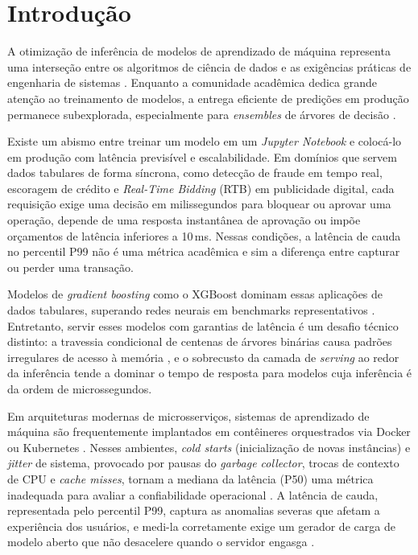 \section{Introdução}

A otimização de inferência de modelos de aprendizado de máquina representa
uma interseção entre os algoritmos de ciência de dados e as exigências
práticas de engenharia de sistemas \cite{nakandala2020}. Enquanto a
comunidade acadêmica dedica grande atenção ao treinamento de modelos, a
entrega eficiente de predições em produção permanece subexplorada,
especialmente para \textit{ensembles} de árvores de decisão
\cite{asadi2024}.

Existe um abismo entre treinar um modelo em um \textit{Jupyter Notebook} e
colocá-lo em produção com latência previsível e escalabilidade. Em domínios
que servem dados tabulares de forma síncrona, como detecção de fraude em
tempo real, escoragem de crédito e \textit{Real-Time Bidding} (RTB) em
publicidade digital, cada requisição exige uma decisão em milissegundos para
bloquear ou aprovar uma operação, depende de uma resposta instantânea de
aprovação ou impõe orçamentos de latência inferiores a 10\,ms. Nessas
condições, a latência de cauda no percentil P99 não é uma métrica acadêmica
e sim a diferença entre capturar ou perder uma transação.

Modelos de \textit{gradient boosting} como o XGBoost dominam essas
aplicações de dados tabulares, superando redes neurais em benchmarks
representativos \cite{chen2016, grinsztajn2022}. Entretanto, servir esses
modelos com garantias de latência é um desafio técnico distinto: a
travessia condicional de centenas de árvores binárias causa padrões
irregulares de acesso à memória \cite{nakandala2020}, e o sobrecusto da
camada de \textit{serving} ao redor da inferência tende a dominar o tempo de
resposta para modelos cuja inferência é da ordem de microssegundos.

Em arquiteturas modernas de microsserviços, sistemas de aprendizado de
máquina são frequentemente implantados em contêineres orquestrados via
Docker ou Kubernetes \cite{zaharia2024}. Nesses ambientes, \textit{cold
starts} (inicialização de novas instâncias) e \textit{jitter} de sistema,
provocado por pausas do \textit{garbage collector}, trocas de contexto de
CPU e \textit{cache misses}, tornam a mediana da latência (P50) uma métrica
inadequada para avaliar a confiabilidade operacional \cite{dean2013}. A
latência de cauda, representada pelo percentil P99, captura as anomalias
severas que afetam a experiência dos usuários, e medi-la corretamente exige
um gerador de carga de modelo aberto que não desacelere quando o servidor
engasga \cite{tene2015}.

